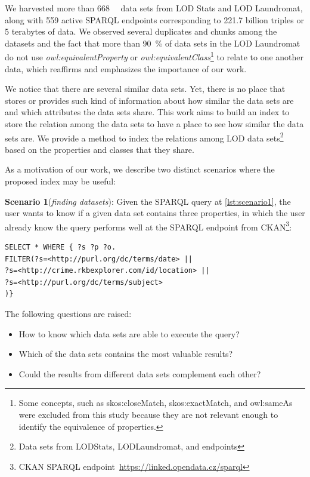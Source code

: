 \documentclass[sw]{iosart2x}
\begin{document}
We harvested more than \SI{668}{\kilo\nothing} data sets from LOD Stats and LOD Laundromat, along with 559 active SPARQL endpoints corresponding to 221.7 billion triples or 5 terabytes of data. We observed several duplicates and chunks among the datasets and the fact that more than \SI{90}{\percent} of data sets in the LOD Laundromat do not use \textit{owl:equivalentProperty} or \textit{owl:equivalentClass}\footnote{Some concepts, such as skos:closeMatch, skos:exactMatch, and owl:sameAs were excluded from this study because they are not relevant enough to identify the equivalence of properties.} to relate to one another data, which reaffirms and emphasizes the importance of our work.

We notice that there are several similar data sets.
Yet, there is no place that stores or provides such kind of information about how similar the data sets are and which attributes the data sets share. This work aims to build an index to store the relation among the data sets to have a place to see how similar the data sets are. We provide a method to index the relations among LOD data sets\footnote{Data sets from LODStats, LODLaundromat, and endpoints} based on the properties and classes that they share.

As a motivation of our work, we describe two distinct scenarios where the proposed index may be useful:

\textbf{Scenario 1}(\textit{finding datasets}): Given the SPARQL query at \cref{lst:scenario1}, the user wants to know if a given data set contains three properties, in which the user already know the query performs well at the SPARQL endpoint from CKAN\footnote{  CKAN SPARQL endpoint~\url{https://linked.opendata.cz/sparql}}:

\begin{lstlisting}[language=SPARQL, label={lst:scenario1}, caption=Scenario 1.]
SELECT * WHERE { ?s ?p ?o.
FILTER(?s=<http://purl.org/dc/terms/date> || 
?s=<http://crime.rkbexplorer.com/id/location> || 
?s=<http://purl.org/dc/terms/subject>
)}
\end{lstlisting}

The following questions are raised:
\begin{itemize}
    \item How to know which data sets are able to execute the query?
    \item Which of the data sets contains the most valuable results?
    \item Could the results from different data sets complement each other?
\end{itemize}
\end{document}
